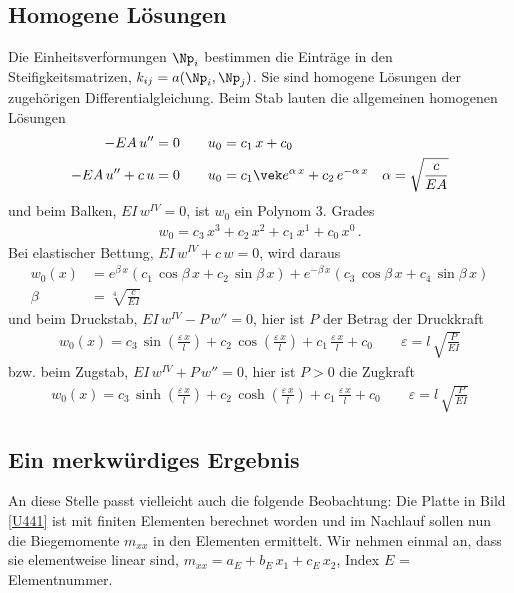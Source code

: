 {%
\textcolor{blau2}{\subsection{Homogene L\"{o}sungen}}
Die Einheitsverformungen $\Np_i$ bestimmen die Eintr\"{a}ge in den Steifigkeitsmatrizen, $k_{ij} = a(\Np_i,\Np_j)$. Sie sind homogene L\"{o}sungen der zugeh\"{o}rigen Differentialgleichung. Beim Stab lauten die allgemeinen homogenen L\"{o}sungen
\begin{align}
-EA\,u'' &= 0 \qquad u_0 = c_1\,x + c_0 \\
-EA\,u'' + c\,u &= 0 \qquad u_0 = c_1 \vek e^{\alpha\,x} + c_2\,e^{- \alpha\,x} \quad\alpha = \sqrt{\frac{c}{EA}}
\end{align}
und beim Balken, $EI\,w^{IV} = 0$, ist $w_0$ ein Polynom 3. Grades
\begin{align}
w_0 = c_3\,x^3 + c_2\,x^2 + c_1\,x^1 + c_0\,x^0\,.
\end{align}
Bei elastischer Bettung, $EI\,w^{IV} + c\,w = 0$, wird daraus
\begin{align}
w_0(x) &= e^{\beta\,x}(c_1\,\cos \beta\,x + c_2\, \sin \beta\,x) +
e^{-\beta\,x}(c_3\,\cos \beta\,x + c_4\, \sin
\beta\,x)\\
\beta &= \sqrt[4]{\frac{c}{EI}}
\end{align}
und beim Druckstab, $EI\,w^{IV} - P\,w'' = 0$, hier ist $P$ der Betrag der Druckkraft
\begin{align}
w_0(x) = c_3\,\sin(\frac{\varepsilon\,x}{l}) + c_2\,\cos(\frac{\varepsilon\,x}{l}) + c_1\,\frac{\varepsilon\,x}{l} + c_0 \qquad \varepsilon = l\,\sqrt{\frac{P}{EI}}
\end{align}
bzw. beim Zugstab, $EI\,w^{IV} + P\,w'' = 0$, hier ist $P > 0$ die Zugkraft
\begin{align}
w_0(x) = c_3\,\sinh(\frac{\varepsilon\,x}{l}) + c_2\,\cosh(\frac{\varepsilon\,x}{l}) + c_1\,\frac{\varepsilon\,x}{l} + c_0\qquad \varepsilon = l\,\sqrt{\frac{P}{EI}}
\end{align}

\textcolor{blau2}{\subsection{Ein merkw\"{u}rdiges Ergebnis}}\label{Dimensionsbetrachtung}
An diese Stelle passt vielleicht auch die folgende Beobachtung: Die Platte in Bild \ref{U441} ist mit finiten Elementen berechnet worden und im Nachlauf sollen nun die Biegemomente $m_{xx}$ in den Elementen ermittelt. Wir nehmen einmal an, dass sie elementweise linear sind, $m_{xx} = a_E + b_E\,x_1 + c_E\,x_2$, Index $E $ = Elementnummer.

}
